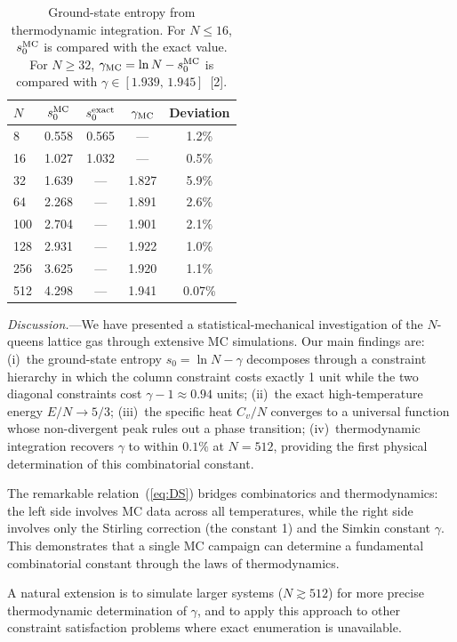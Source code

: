 \documentclass{iopjournal}
\begin{document}
\begin{table}[t]
\caption{Ground-state entropy from thermodynamic integration.
For $N \le 16$, $s_0^{\rm MC}$ is compared with the exact value.
For $N \ge 32$, $\gamma_{\rm MC} = \ln N - s_0^{\rm MC}$ is
compared with $\gamma \in [1.939,\, 1.945]$~[2].}
\centering
\begin{tabular}{l c c c c}
\hline
$N$ & $s_0^{\rm MC}$ & $s_0^{\rm exact}$ & $\gamma_{\rm MC}$
    & Deviation \\
\hline
8   & 0.558 & 0.565 & ---   & 1.2\% \\
16  & 1.027 & 1.032 & ---   & 0.5\% \\
\hline
32  & 1.639 & ---   & 1.827 & 5.9\% \\
64  & 2.268 & ---   & 1.891 & 2.6\% \\
100 & 2.704 & ---   & 1.901 & 2.1\% \\
128 & 2.931 & ---   & 1.922 & 1.0\% \\
256 & 3.625 & ---   & 1.920 & 1.1\% \\
512 & 4.298 & ---   & 1.941 & 0.07\% \\
\hline
\end{tabular}
\label{tab:entropy}
\end{table}

\textit{Discussion.}---We have presented a statistical-mechanical
investigation of the $N$-queens lattice gas through extensive MC
simulations.  Our main findings are: (i)~the ground-state entropy
$s_0 = \ln N - \gamma$ decomposes through a constraint hierarchy
in which the column constraint costs exactly 1 unit while the two
diagonal constraints cost $\gamma - 1 \approx 0.94$ units;
(ii)~the exact high-temperature energy $E/N \to 5/3$;
(iii)~the specific heat $C_v/N$ converges to a universal function
whose non-divergent peak rules out a phase transition;
(iv)~thermodynamic integration recovers $\gamma$ to within $0.1\%$
at $N = 512$, providing the first physical determination of this
combinatorial constant.

The remarkable relation~(\ref{eq:DS}) bridges combinatorics and
thermodynamics: the left side involves MC data across all
temperatures, while the right side involves only the Stirling
correction (the constant 1) and the Simkin constant $\gamma$.
This demonstrates that a single MC campaign can determine a
fundamental combinatorial constant through the laws of
thermodynamics.

A natural extension is to simulate larger systems ($N \gtrsim 512$)
for more precise thermodynamic determination of $\gamma$, and to
apply this approach to other constraint satisfaction problems where
exact enumeration is unavailable.
\end{document}
